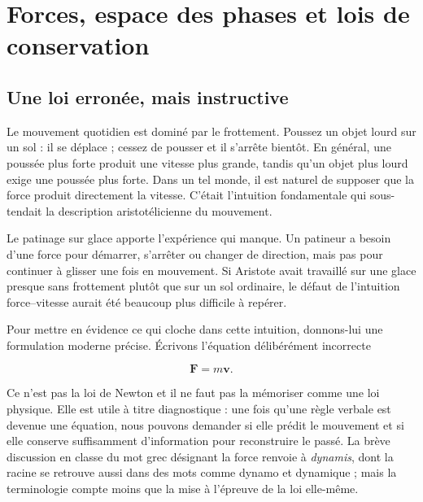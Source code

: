 \chapter{Forces, espace des phases et lois de conservation}


\section{Une loi erronée, mais instructive}

Le mouvement quotidien est dominé par le frottement. Poussez un objet lourd sur un sol : il se déplace ; cessez de pousser et il s’arrête bientôt. En général, une poussée plus forte produit une vitesse plus grande, tandis qu’un objet plus lourd exige une poussée plus forte. Dans un tel monde, il est naturel de supposer que la force produit directement la vitesse. C’était l’intuition fondamentale qui sous-tendait la description aristotélicienne du mouvement.

Le patinage sur glace apporte l’expérience qui manque. Un patineur a besoin d’une force pour démarrer, s’arrêter ou changer de direction, mais pas pour continuer à glisser une fois en mouvement. Si Aristote avait travaillé sur une glace presque sans frottement plutôt que sur un sol ordinaire, le défaut de l’intuition force--vitesse aurait été beaucoup plus difficile à repérer.

Pour mettre en évidence ce qui cloche dans cette intuition, donnons-lui une formulation moderne précise. Écrivons l’équation délibérément incorrecte

\begin{equation}
  \mathbf F=m\mathbf v.
  \label{eq:aristotle-vector-law}
\end{equation}

Ce n’est pas la loi de Newton et il ne faut pas la mémoriser comme une loi physique. Elle est utile à titre diagnostique : une fois qu’une règle verbale est devenue une équation, nous pouvons demander si elle prédit le mouvement et si elle conserve suffisamment d’information pour reconstruire le passé. La brève discussion en classe du mot grec désignant la force renvoie à \emph{dynamis}, dont la racine se retrouve aussi dans des mots comme dynamo et dynamique ; mais la terminologie compte moins que la mise à l’épreuve de la loi elle-même.

